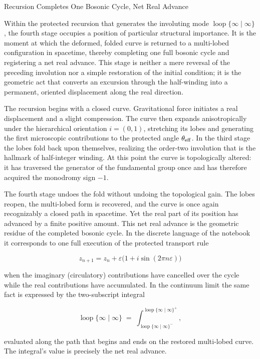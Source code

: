 Recursion Completes One Bosonic Cycle, Net Real Advance

Within the protected recursion that generates the involuting mode \(\operatorname{loop}\{\infty\mid\infty\}\), the fourth stage occupies a position of particular structural importance. It is the moment at which the deformed, folded curve is returned to a multi-lobed configuration in spacetime, thereby completing one full bosonic cycle and registering a net real advance. This stage is neither a mere reversal of the preceding involution nor a simple restoration of the initial condition; it is the geometric act that converts an excursion through the half-winding into a permanent, oriented displacement along the real direction.

The recursion begins with a closed curve. Gravitational force initiates a real displacement and a slight compression. The curve then expands anisotropically under the hierarchical orientation \(i=(0,1)\), stretching its lobes and generating the first microscopic contributions to the protected angle \(\theta_{\rm eff}\). In the third stage the lobes fold back upon themselves, realizing the order-two involution that is the hallmark of half-integer winding. At this point the curve is topologically altered: it has traversed the generator of the fundamental group once and has therefore acquired the monodromy sign \(-1\).

The fourth stage undoes the fold without undoing the topological gain. The lobes reopen, the multi-lobed form is recovered, and the curve is once again recognizably a closed path in spacetime. Yet the real part of its position has advanced by a finite positive amount. This net real advance is the geometric residue of the completed bosonic cycle. In the discrete language of the notebook it corresponds to one full execution of the protected transport rule

\[
z_{n+1}=z_n+\varepsilon\bigl(1+i\sin(2\pi n\varepsilon)\bigr)
\]

when the imaginary (circulatory) contributions have cancelled over the cycle while the real contributions have accumulated. In the continuum limit the same fact is expressed by the two-subscript integral

\[
\operatorname{loop}\{\infty\mid\infty\}
\;=\;
\int_{\operatorname{loop}\{\infty\mid\infty\}^{-}}^{\operatorname{loop}\{\infty\mid\infty\}^{+}},
\]

evaluated along the path that begins and ends on the restored multi-lobed curve. The integral’s value is precisely the net real advance.

